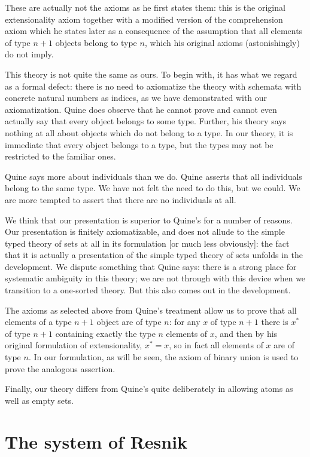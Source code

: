 \documentclass[12pt]{article}
\begin{document}
These are actually not the axioms as he first states them:  this is the original extensionality axiom together with a modified version of the comprehension axiom which he states later as a consequence of the assumption that all elements of type $n+1$ objects belong to type $n$, which his original axioms (astonishingly) do not imply.

This theory is not quite the same as ours.  To begin with, it has what we regard as a formal defect:  there is no need to axiomatize the theory with schemata with concrete natural numbers as indices, as we have demonstrated with our axiomatization.  Quine does observe that he cannot prove and cannot even actually say that every object belongs to some type.  Further, his theory says nothing at all about objects which do not belong to a type. In our theory, it is immediate that every object belongs to a type, but the types may not be restricted to the familiar ones.

Quine says more about individuals than we do.  Quine asserts that all individuals belong to the same type.  We have not felt the need to do this, but we could.  We are more tempted to assert that there are no individuals at all.

We think that our presentation is superior to Quine's for a number of reasons.  Our presentation is finitely axiomatizable, and does not allude to the simple typed theory of sets at all in its formulation [or much less obviously]:  the fact that it is actually a presentation of the simple typed theory of sets unfolds in the development.  We dispute something that Quine says:  there is a strong place for systematic ambiguity in this theory; we are not through with this device when we transition to a one-sorted theory.  But this also comes out in the development.

The axioms as selected above from Quine's treatment allow us to prove that
all elements of a type $n+1$ object are of type $n$:  for any $x$ of type $n+1$ there
is $x^*$ of type $n+1$ containing exactly the type $n$ elements of $x$, and then by his original formulation of extensionality, $x^*=x$, so in fact all elements of $x$ are of type $n$.  In our formulation, as will be seen, the axiom of binary union is used to prove the analogous assertion.

Finally, our theory differs from Quine's quite deliberately in allowing atoms as well as empty sets.

\section{The system of Resnik}
\end{document}
